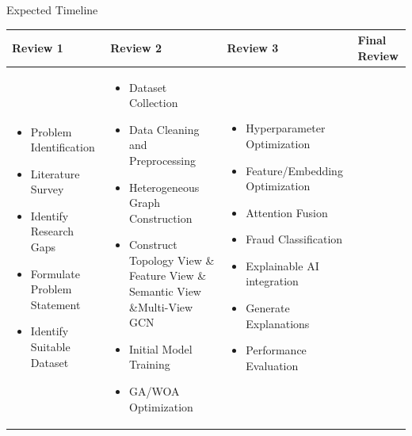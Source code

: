 \documentclass[aspectratio=169,11pt]{beamer}
\begin{document}
\begin{frame}{Expected Timeline}

\centering
\scriptsize

\begin{tabular}{p{}p{}p{}p{}}
\toprule

\textbf{Review 1} &
\textbf{Review 2} &
\textbf{Review 3} &
\textbf{Final Review} \\

\midrule

\begin{itemize}
    \item Problem Identification
    \item Literature Survey
    \item Identify Research Gaps
    \item Formulate Problem Statement
    \item Identify Suitable Dataset
\end{itemize}

&

\begin{itemize}
    \item Dataset Collection
    \item Data Cleaning and Preprocessing
    \item Heterogeneous Graph Construction
    \item Construct Topology View \& Feature View \& Semantic View
     \&Multi-View GCN
    \item Initial Model Training
    \item GA/WOA Optimization
\end{itemize}

&

\begin{itemize}
    \item Hyperparameter Optimization
    \item Feature/Embedding Optimization
    \item Attention Fusion
    \item Fraud Classification
    \item Explainable AI integration
    \item Generate Explanations
    \item Performance Evaluation
 
\end{itemize}


\end{tabular}
\end{frame}
\end{document}
